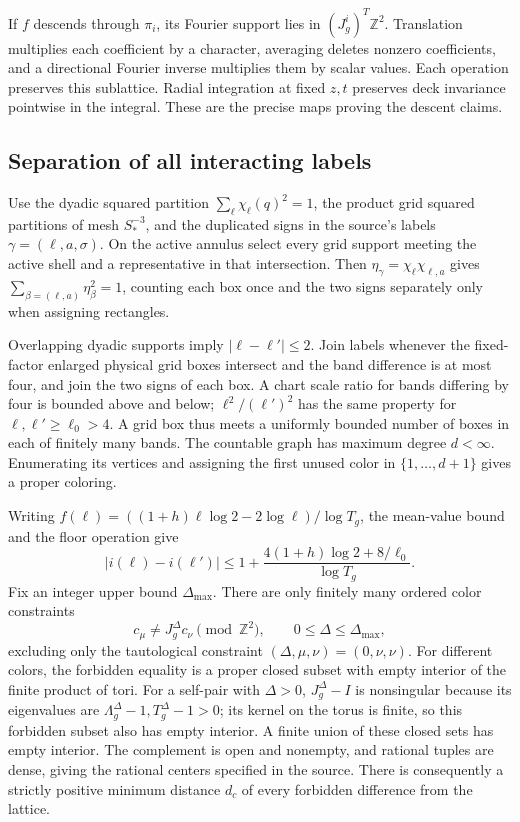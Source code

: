 \documentclass[10pt,a4paper]{article}
\begin{document}
If \(f\) descends through \(\pi_i\), its Fourier support lies in \((J_g^i)^T\mathbb Z^2\). Translation multiplies each coefficient by a character, averaging deletes nonzero coefficients, and a directional Fourier inverse multiplies them by scalar values. Each operation preserves this sublattice. Radial integration at fixed \(z,t\) preserves deck invariance pointwise in the integral. These are the precise maps proving the descent claims.

\subsection{Separation of all interacting labels}\label{separation-of-all-interacting-labels}

Use the dyadic squared partition \(\sum_\ell\chi_\ell(q)^2=1\), the product grid squared partitions of mesh \(S_*^{-3}\), and the duplicated signs in the source's labels \(\gamma=(\ell,a,\sigma)\). On the active annulus select every grid support meeting the active shell and a representative in that intersection. Then \(\eta_\gamma=\chi_\ell\chi_{\ell,a}\) gives \(\sum_{\beta=(\ell,a)}\eta_\beta^2=1\), counting each box once and the two signs separately only when assigning rectangles.

Overlapping dyadic supports imply \(|\ell-\ell'|\le2\). Join labels whenever the fixed-factor enlarged physical grid boxes intersect and the band difference is at most four, and join the two signs of each box. A chart scale ratio for bands differing by four is bounded above and below; \(\ell^2/(\ell')^2\) has the same property for \(\ell,\ell'\ge\ell_0>4\). A grid box thus meets a uniformly bounded number of boxes in each of finitely many bands. The countable graph has maximum degree \(d<\infty\). Enumerating its vertices and assigning the first unused color in \(\{1,\ldots,d+1\}\) gives a proper coloring.

Writing \(f(\ell)=((1+h)\ell\log2-2\log\ell)/\log T_g\), the mean-value bound and the floor operation give \[
|i(\ell)-i(\ell')|\le1+\frac{4(1+h)\log2+8/\ell_0}{\log T_g}.
\] Fix an integer upper bound \(\Delta_{\max}\). There are only finitely many ordered color constraints \[
c_\mu\ne J_g^\Delta c_\nu\pmod {\mathbb Z^2},\qquad0\le\Delta\le\Delta_{\max},
\] excluding only the tautological constraint \((\Delta,\mu,\nu)=(0,\nu,\nu)\). For different colors, the forbidden equality is a proper closed subset with empty interior of the finite product of tori. For a self-pair with \(\Delta>0\), \(J_g^\Delta-I\) is nonsingular because its eigenvalues are \(\Lambda_g^\Delta-1,T_g^\Delta-1>0\); its kernel on the torus is finite, so this forbidden subset also has empty interior. A finite union of these closed sets has empty interior. The complement is open and nonempty, and rational tuples are dense, giving the rational centers specified in the source. There is consequently a strictly positive minimum distance \(d_c\) of every forbidden difference from the lattice.
\end{document}
